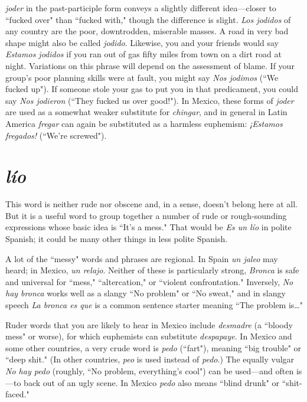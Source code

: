 \emph{joder} in the past-participle form conveys a slightly different
idea---closer to ``fucked over" than ``fucked with," though the difference is slight. \emph{Los jodidos} of any country are the poor, downtrodden,
miserable masses. A road in very bad shape might also be called \emph{jodido}. Likewise, you and your friends would say \emph{Estamos jodidos} if you
ran out of gas fifty miles from town on a dirt road at night. Variations
on this phrase will depend on the assessment of blame. If your group's
poor planning skills were at fault, you might say \emph{Nos jodimos} (``We
fucked up"). If someone stole your gas to put you in that predicament,
you could say \emph{Nos jodieron} (``They fucked us over good!"). In Mexico,
these forms of \emph{joder} are used as a somewhat weaker substitute for
\emph{chingar}, and in general in Latin America \emph{fregar} can again be substituted as a harmless euphemism: \emph{¡Estamos fregados!} (``We're screwed").

\section{\emph{lío}}

This word is neither rude nor obscene and, in a sense, doesn't
belong here at all. But it is a useful word to group together a number of
rude or rough-sounding expressions whose basic idea is ``It's a mess."
That would be \emph{Es un lío} in polite Spanish; it could be many other
things in less polite Spanish.

A lot of the ``messy" words and phrases are regional. In Spain
\emph{un jaleo} may heard; in Mexico, \emph{un relajo}. Neither of these is particularly strong, \emph{Bronca} is safe and universal for ``mess," ``altercation,"
or ``violent confrontation." Inversely, \emph{No hay bronca} works well as a
slangy ``No problem" or ``No sweat," and in slangy speech \emph{La bronca
es que} is a common sentence starter meaning ``The problem is\ldots{}"

Ruder words that you are likely to hear in Mexico include \emph{desmadre} (a ``bloody mess" or worse), for which euphemists can substitute \emph{despapaye}. In Mexico and some other countries, a very crude
word is \emph{pedo} (``fart"), meaning ``big trouble" or ``deep shit." (In other
countries, \emph{peo} is used instead of \emph{pedo}.) The equally vulgar \emph{No hay
pedo} (roughly, ``No problem, everything's cool") can be used---and
often is---to back out of an ugly scene. In Mexico \emph{pedo} also means
``blind drunk" or ``shit-faced."

